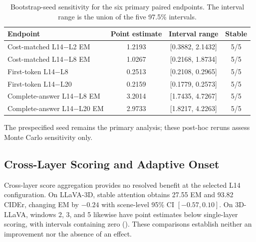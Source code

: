\begin{table}[t]
\centering
\small
\caption{Bootstrap-seed sensitivity for the six primary paired endpoints. The interval range is the union of the five 97.5\% intervals.}
\label{tab:supp_primary_seed}
\begin{tabular}{lccc}
\toprule
Endpoint & Point estimate & Interval range & Stable \\
\midrule
Cost-matched L14$-$L2 EM & 1.2193 & [0.3882, 2.1432] & 5/5 \\
Cost-matched L14$-$L8 EM & 1.0267 & [0.2168, 1.8734] & 5/5 \\
First-token L14$-$L8 & 0.2513 & [0.2108, 0.2965] & 5/5 \\
First-token L14$-$L20 & 0.2159 & [0.1779, 0.2573] & 5/5 \\
Complete-answer L14$-$L8 EM & 3.2014 & [1.7435, 4.7267] & 5/5 \\
Complete-answer L14$-$L20 EM & 2.9733 & [1.8217, 4.2263] & 5/5 \\
\bottomrule
\end{tabular}
\end{table}

The prespecified seed remains the primary analysis; these post-hoc reruns assess Monte Carlo sensitivity only.

\subsection{Cross-Layer Scoring and Adaptive Onset}
Cross-layer score aggregation provides no resolved benefit at the selected L14 configuration. On LLaVA-3D, stable attention obtains 27.55 EM and 93.82 CIDEr, changing EM by $-0.24$ with scene-level 95\% CI $[-0.57,0.10]$. On 3D-LLaVA, windows 2, 3, and 5 likewise have point estimates below single-layer scoring, with intervals containing zero (). These comparisons establish neither an improvement nor the absence of an effect.

\begin{table}[t]
\centering
\caption{Stable-attention scoring on 3D-LLaVA ScanQA, L14, 10/100 tokens.}
\label{tab:supp_stable}
\end{table}

